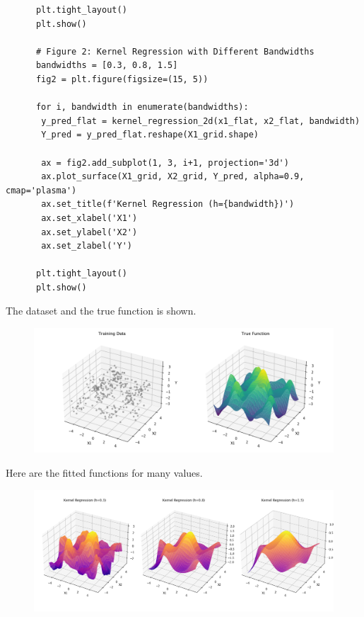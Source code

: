 \begin{example}
\begin{lstlisting}
      plt.tight_layout()
      plt.show()

      # Figure 2: Kernel Regression with Different Bandwidths
      bandwidths = [0.3, 0.8, 1.5]
      fig2 = plt.figure(figsize=(15, 5))

      for i, bandwidth in enumerate(bandwidths):
       y_pred_flat = kernel_regression_2d(x1_flat, x2_flat, bandwidth)
       Y_pred = y_pred_flat.reshape(X1_grid.shape)
       
       ax = fig2.add_subplot(1, 3, i+1, projection='3d')
       ax.plot_surface(X1_grid, X2_grid, Y_pred, alpha=0.9, cmap='plasma')
       ax.set_title(f'Kernel Regression (h={bandwidth})')
       ax.set_xlabel('X1')
       ax.set_ylabel('X2')
       ax.set_zlabel('Y')

      plt.tight_layout()
      plt.show()
    \end{lstlisting}
    
    The dataset and the true function is shown. 

    \begin{figure}[H]
      \centering 
      \includegraphics[scale=0.4]{img/kernel_reg_2d_true.png}
      \caption{} 
    \end{figure}

    Here are the fitted functions for many values. 

    \begin{figure}[H]
      \centering 
      \includegraphics[scale=0.4]{img/kernel_reg_2d_est.png}
      \caption{} 
    \end{figure}
  \end{example} 

